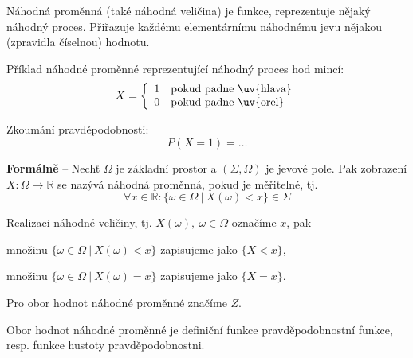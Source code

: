\begin{compactitem}
    \item Náhodná proměnná (také náhodná veličina) je funkce, reprezentuje nějaký náhodný proces. Přiřazuje každému elementárnímu náhodnému jevu nějakou (zpravidla číselnou) hodnotu. \begin{compactitem}


        \item Příklad náhodné proměnné reprezentující náhodný proces hod mincí:
        $$ X = \left\{
            \begin{array}{ll}
                1 & \text{pokud padne \uv{hlava}} \\
                0 & \text{pokud padne \uv{orel}}
            \end{array}
            \right.$$

        Zkoumání pravděpodobnosti:
        $$ P(X = 1) = \ldots$$

    \end{compactitem}

    \item \textbf{Formálně} -- Nechť $\Omega$ je základní prostor a $(\Sigma, \Omega)$ je jevové pole. Pak zobrazení $X : \Omega \rightarrow \mathbb{R}$ se nazývá náhodná proměnná, pokud je měřitelné, tj.
    $$\forall x \in \mathbb{R} : \{ \omega \in \Omega ~|~ X(\omega) < x \} \in \Sigma$$

    \item Realizaci náhodné veličiny, tj. $X(\omega),~ \omega \in \Omega$ označíme $x$, pak \begin{compactitem}
        \item množinu $\{ \omega \in \Omega ~|~ X(\omega) < x \}$ zapisujeme jako $\{ X < x \}$,

        \item množinu $\{ \omega \in \Omega ~|~ X(\omega) = x \}$ zapisujeme jako $\{ X = x \}$.
    \end{compactitem}


    \item Pro obor hodnot náhodné proměnné značíme $Z$. \begin{compactitem}
        \item Obor hodnot náhodné proměnné je definiční funkce pravděpodobnostní funkce, resp. funkce hustoty pravděpodobnostni.
    \end{compactitem}

\end{compactitem}

